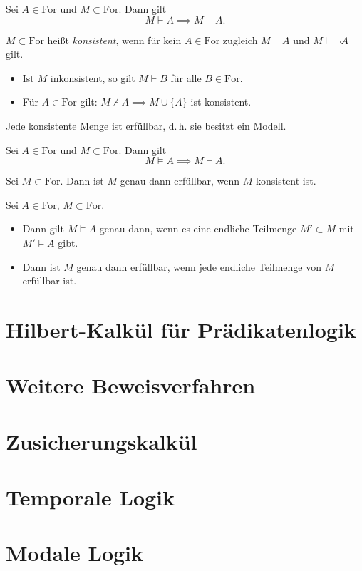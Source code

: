 \documentclass{cheat-sheet}
\newcommand{\For}{\mathrm{For}}
\begin{document}

\begin{satz}[Korrektheitssatz]
  Sei $A \in \For$ und $M \subset \For$. Dann gilt
  \[ M \vdash A \implies M \models A. \]
\end{satz}

\begin{defn}
  $M \subset \For$ heißt \emph{konsistent}, wenn für kein $A \in \For$ zugleich $M \vdash A$ und $M \vdash \neg A$ gilt.
\end{defn}

\begin{lem}
  \begin{itemize}
    \item Ist $M$ inkonsistent, so gilt $M \vdash B$ für alle $B \in \For$.
    \item Für $A \in \For$ gilt: $M \not\vdash A \implies M \cup \{ A \}$ ist konsistent.
  \end{itemize}
\end{lem}

\begin{lem}
  Jede konsistente Menge ist erfüllbar, d.\,h. sie besitzt ein Modell.
\end{lem}

\begin{satz}[Vollständigkeitssatz]
  Sei $A \in \For$ und $M \subset \For$. Dann gilt
  \[ M \models A \implies M \vdash A. \]
\end{satz}

\begin{prop}
  Sei $M \subset \For$. Dann ist $M$ genau dann erfüllbar, wenn $M$ konsistent ist.
\end{prop}

\begin{satz} Sei $A \in \For$, $M \subset \For$.
  \begin{itemize}
    \item Dann gilt $M \models A$ genau dann, wenn es eine endliche Teilmenge $M' \subset M$ mit $M' \models A$ gibt.
    \item Dann ist $M$ genau dann erfüllbar, wenn jede endliche Teilmenge von $M$ erfüllbar ist.
  \end{itemize}
\end{satz}

\section{Hilbert-Kalkül für Prädikatenlogik}

\section{Weitere Beweisverfahren}

\section{Zusicherungskalkül}

\section{Temporale Logik}

\section{Modale Logik}
\end{document}

